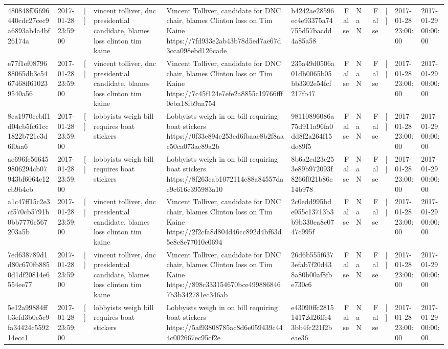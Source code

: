 \begin{tabular}{llllllrlrlll}
480848f05696440cdc27cec9a6893ab4a4bf26174a & 2017-01-28 23:59:00 & [] & vincent tolliver, dnc presidential candidate, blames loss clinton tim kaine & Vincent Tolliver, candidate for DNC chair, blames Clinton loss on Tim Kaine https://7fd933e2ab43b78d5ed7ae67d3cca098ebd126cade & b4242ae28596ec4e93375a74755d57bacdd4a85a58 & False & NaN & False & [] & 2017-01-28 23:00:00 & 2017-01-29 00:00:00 \\
e77f1ef0879688065db3c5467468ff610239540a56 & 2017-01-28 23:59:00 & [] & vincent tolliver, dnc presidential candidate, blames loss clinton tim kaine & Vincent Tolliver, candidate for DNC chair, blames Clinton loss on Tim Kaine https://7c45f124e7efe2a8855c19766fff0eba18fb9aa754 & 235a49d0506a01db0065b05bb3302e54fcf217fb47 & False & NaN & False & [] & 2017-01-28 23:00:00 & 2017-01-29 00:00:00 \\
8ca1970ccbff1d04cb5fc61cc1822b721c3d6f0aa6 & 2017-01-28 23:59:00 & [] & lobbyists weigh bill requires boat stickers & Lobbyists weigh in on bill requiring boat stickers https://0f33e894e253ed6fbaae8b2f8aac50ca073ac89a2b & 98110896086a75d911a96fa0dd8f2a264f15de89f5 & False & NaN & False & [] & 2017-01-28 23:00:00 & 2017-01-29 00:00:00 \\
ae696fe566459806294cb07943bf6064c12cb9b4eb & 2017-01-28 23:59:00 & [] & lobbyists weigh bill requires boat stickers & Lobbyists weigh in on bill requiring boat stickers https://8f263cab1072114e88a84557dae9c616c395983a10 & 8b6a2cd23c253e89b972093f8266f021b86c14b978 & False & NaN & False & [] & 2017-01-28 23:00:00 & 2017-01-29 00:00:00 \\
a1c47ff15c2e3cf570cb5791b0bb7776c567203a5b & 2017-01-28 23:59:00 & [] & vincent tolliver, dnc presidential candidate, blames loss clinton tim kaine & Vincent Tolliver, candidate for DNC chair, blames Clinton loss on Tim Kaine https://2f2cfa8d804d46cc892d4bf63d5e8e8e77010e0694 & 2c0edd995bde055c13713b3b9b330ca8e0747c995f & False & NaN & False & [] & 2017-01-28 23:00:00 & 2017-01-29 00:00:00 \\
7ed638789d1d80c670fb8850d1df20814e6554ee77 & 2017-01-28 23:59:00 & [] & vincent tolliver, dnc presidential candidate, blames loss clinton tim kaine & Vincent Tolliver, candidate for DNC chair, blames Clinton loss on Tim Kaine https://898c333154670bce4998868467b3b342781ec346ab & 26d6b555f6373efab7f20d438a80b00af8fbe730c6 & False & NaN & False & [] & 2017-01-28 23:00:00 & 2017-01-29 00:00:00 \\
5e12a99884ffb3efd3b0e5c9fa34424c559214ecc1 & 2017-01-28 23:59:00 & [] & lobbyists weigh bill requires boat stickers & Lobbyists weigh in on bill requiring boat stickers https://5af93808785ac8d6e059439c444c002667ec95cf2e & e43090ffc281514172d26ffc43bb4fc221f2beae36 & False & NaN & False & [] & 2017-01-28 23:00:00 & 2017-01-29 00:00:00 \\

\end{tabular}
